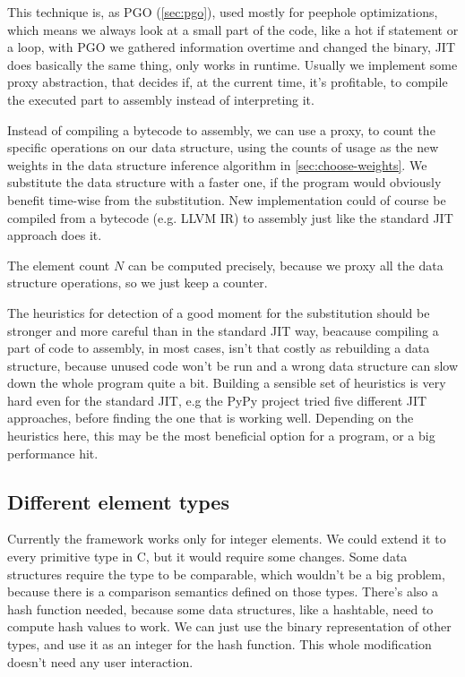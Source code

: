 \documentclass[a4paper,11pt]{article}
\begin{document}
            This technique is, as PGO (\autoref{sec:pgo}), used mostly for peephole optimizations, which means we always
            look at a small part of the code, like a hot if statement or a loop, with PGO we gathered information
            overtime and changed the binary, JIT does basically the same thing, only works in runtime. Usually we
            implement some proxy abstraction, that decides if, at the current time, it's profitable, to compile the
            executed part to assembly instead of interpreting it.

            Instead of compiling a bytecode to assembly, we can use a proxy, to count the specific operations on our
            data structure, using the counts of usage as the new weights in the data structure inference algorithm in
            \autoref{sec:choose-weights}. We substitute the data structure with a faster one, if the program would
            obviously benefit time-wise from the substitution. New implementation could of course be compiled from a
            bytecode (e.g. LLVM IR) to assembly just like the standard JIT approach does it.

            The element count $N$ can be computed precisely, because we proxy all the data structure operations, so we
            just keep a counter.

            The heuristics for detection of a good moment for the substitution should be stronger and more careful than
            in the standard JIT way, beacause compiling a part of code to assembly, in most cases, isn't that costly as
            rebuilding a data structure, because unused code won't be run and a wrong data structure can slow down the
            whole program quite a bit. Building a sensible set of heuristics is very hard even for the standard JIT, e.g
            the PyPy project tried five different JIT approaches, before finding the one that is working well. Depending
            on the heuristics here, this may be the most beneficial option for a program, or a big performance hit.

	\subsection{Different element types}

		Currently the framework works only for integer elements. We could extend it to every primitive type in
		C, but it would require some changes.  Some data structures require the type to be comparable, which
		wouldn't be a big problem, because there is a comparison semantics defined on those types. There's also
		a hash function needed, because some data structures, like a hashtable, need to compute hash values to
		work. We can just use the binary representation of other types, and use it as an integer for the hash
		function. This whole modification doesn't need any user interaction.
\end{document}
